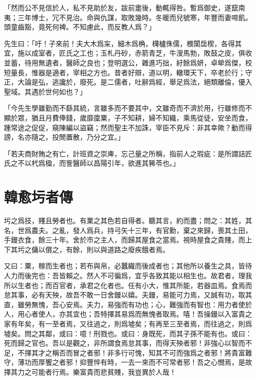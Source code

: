 「然而公不見信於人，私不見助於友，跋前疐後，動輒得咎。暫爲御史，遂竄南夷；三年博士，冗不見治。命與仇謀，取敗幾時。冬暖而兒號寒，年豐而妻啼飢。頭童齒豁，竟死何裨。不知慮此，而反教人爲？」

先生曰：「吁！子來前！夫大木爲杗，細木爲桷，欂櫨侏儒，椳闑扂楔，各得其宜，施以成室者，匠氏之工也；玉札丹砂，赤箭青芝，牛溲馬勃，敗鼓之皮，俱收並蓄，待用無遺者，醫師之良也；登明選公，雜進巧拙，紆餘爲妍，卓犖爲傑，校短量長，惟器是適者，宰相之方也。昔者好辯，道以明，轍環天下，卒老於行；守正，大論是弘，逃讒於，廢死。是二儒者，吐辭爲經，舉足爲法，絕類離倫，優入聖域。其遇於世何如也？」

「今先生學雖勤而不{繇}其統，言雖多而不要其中，文雖奇而不濟於用，行雖修而不顯於眾，猶且月費俸錢，歲靡廩粟，子不知耕，婦不知織，乘馬從徒，安坐而食，踵常途之促促，窺陳編以盜竊；然而聖主不加誅，宰臣不見斥：非其幸歟？動而得謗，名亦隨之，投閒置散，乃分之宜。」%

「若夫商財賄之有亡，計班資之崇庳，忘己量之所稱，指前人之瑕疵：是所謂詰匠氏之不以杙爲楹，而訾醫師以昌陽引年，欲進其豨苓也。」

\section[圬者王承福傳\quad{\small 韓愈}]{{\normalsize 韓愈}\quad 圬者傳}
圬之爲技，賤且勞者也。有業之其色若自得者。聽其言，約而盡；問之：其姓，其名，世爲農夫。之亂，發人爲兵，持弓矢十三年，有官勳，棄之來歸，喪其土田，手鏝衣食，餘三十年。舍於市之主人，而歸其屋食之當焉。視時屋食之貴賤，而上下其圬之傭以償之，有餘，則以與道路之廢疾餓者焉。

又曰：粟，稼而生者也；若布與帛，必蠶織而後成者也；其他所以養生之具，皆待人力而後完也：吾皆賴之。然人不可徧爲，宜乎各致其能以相生也。故君者，理我所以生者也；而百官者，承君之化者也。任有小大，惟其所能，若器皿焉。食焉而怠其事，必有天殃，故吾不敢一日舍鏝以嬉。夫鏝，易能可力焉，又誠有功，取其直，雖勞無愧，吾心安焉。夫力，易強而有功也；心，難強而有智也：用力者使於人，用心者使人，亦其宜也；吾特擇其易爲而無愧者取焉。嘻！吾操鏝以入富貴之家有年矣，有一至者焉，又往過之，則爲墟矣；有再至三至者焉，而往過之，則爲墟矣。問之其鄰，或曰：噫！刑戮也。或曰：身既死，而其子孫不能有也。或曰：死而歸之官也。吾以是觀之，非所謂食焉怠其事，而得天殃者邪！非強心以智而不足，不擇其才之稱否而冒之者邪！非多行可愧，知其不可而強爲之者邪！將貴富難守，薄功而厚饗之者邪！抑豐悴有時，一去一來而不可常者邪！吾之心憫焉，是故擇其力之可能者行焉。樂富貴而悲貧賤，我豈異於人哉！

